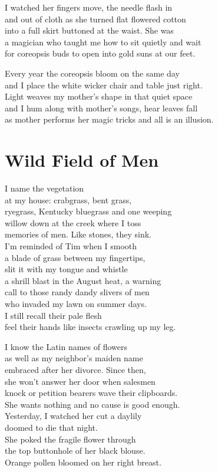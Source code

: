 \documentclass[twoside,10pt]{book}
\begin{document}
I watched her fingers move, the needle flash in\\
and out of cloth as she turned flat flowered cotton\\
into a full skirt buttoned at the waist. She was\\
a magician who taught me how to sit quietly and wait\\
for coreopsis buds to open into gold suns at our feet.

Every year the coreopsis bloom on the same day\\
and I place the white wicker chair and table just right.\\
Light weaves my mother's shape in that quiet space\\
and I hum along with mother's songs, hear leaves fall\\
as mother performs her magic tricks and all is an illusion.


\clearpage
\section{Wild Field of Men}

I name the vegetation\\
at my house: crabgrass, bent grass,\\
ryegrass, Kentucky bluegrass and one weeping\\
willow down at the creek where I toss\\
memories of men. Like stones, they sink.\\
I'm reminded of Tim when I smooth\\
a blade of grass between my fingertips,\\
slit it with my tongue and whistle\\
a shrill blast in the August heat, a warning\\
call to those randy dandy slivers of men\\
who invaded my lawn on summer days.\\
I still recall their pale flesh\\
feel their hands like insects crawling up my leg.

I know the Latin names of flowers\\
as well as my neighbor's maiden name\\
embraced after her divorce. Since then,\\
she won't answer her door when salesmen\\
knock or petition bearers wave their clipboards.\\
She wants nothing and no cause is good enough.\\
Yesterday, I watched her cut a daylily\\
doomed to die that night.\\
She poked the fragile flower through\\
the top buttonhole of her black blouse.\\
Orange pollen bloomed on her right breast.
\end{document}
